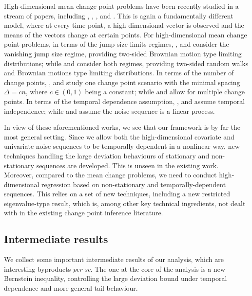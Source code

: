 \documentclass[11pt]{article}
\theoremstyle{plain}
\theoremstyle{definition}
\begin{document}
High-dimensional mean change point problems have been recently studied in a stream of papers, including \cite{bai2010common}, \cite{wangshao2020}, \cite{chen2021inference}, \cite{kaul2021} and \cite{kaul2021inference}.  This is again a fundamentally different model, where at every time point, a high-dimensional vector is observed and the means of the vectors change at certain points. For high-dimensional mean change point problems, in terms of the jump size limits regimes, \cite{bai2010common}, \cite{wangshao2020} and \cite{chen2021inference} consider the vanishing jump size regime, providing two-sided Brownian motion type limiting distributions; while \cite{kaul2021} and \cite{kaul2021inference} consider both regimes, providing two-sided random walks and Brownian motions type limiting distributions.  In terms of the number of change points, \cite{bai2010common}, \cite{wangshao2020} and \cite{kaul2021} study one change point scenario with the minimal spacing $\Delta = cn$, where $c \in (0, 1)$ being a constant; while \cite{chen2021inference} and \cite{kaul2021inference} allow for multiple change points.  In terms of the temporal dependence assumption, \cite{wangshao2020}, \cite{kaul2021} and \cite{kaul2021inference} assume temporal independence; while \cite{bai2010common} and \cite{chen2021inference} assume the noise sequence is a linear process. 

In view of these aforementioned works, we see that our framework is by far the most general setting.  Since we allow both the high-dimensional covariate and univariate noise sequences to be temporally dependent in a nonlinear way, new techniques handling the large deviation behaviours of stationary and non-stationary sequences are developed.  This is unseen in the existing work.  Moreover, compared to the mean change problems, we need to conduct high-dimensional regression based on non-stationary and temporally-dependent sequences.  This relies on a set of new techniques, including a new restricted eigenvalue-type result, which is, among other key technical ingredients, not dealt with in the existing change point inference literature.


\subsection{Intermediate results} \label{sec:theory_preliminary_est}

We collect some important intermediate results of our analysis, which are interesting byproducts \textit{per se}.  The one at the core of the analysis is a new Bernstein inequality, controlling the large deviation bound under temporal dependence and more general tail behaviour. 
\end{document}
